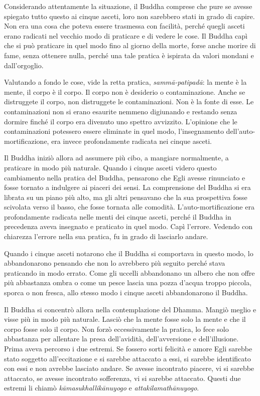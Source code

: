 Considerando attentamente la situazione, il Buddha comprese che pure se
avesse spiegato tutto questo ai cinque asceti, loro non sarebbero stati
in grado di capire. Non era una cosa che poteva essere trasmessa con
facilità, perché quegli asceti erano radicati nel vecchio modo di
praticare e di vedere le cose. Il Buddha capì che si può praticare in
quel modo fino al giorno della morte, forse anche morire di fame, senza
ottenere nulla, perché una tale pratica è ispirata da valori mondani e
dall'orgoglio.

Valutando a fondo le cose, vide la retta pratica, \emph{sammā-patipadā}:
la mente è la mente, il corpo è il corpo. Il corpo non è desiderio o
contaminazione. Anche se distruggete il corpo, non distruggete le
contaminazioni. Non è la fonte di esse. Le contaminazioni non si erano
esaurite nemmeno digiunando e restando senza dormire finché il corpo era
divenuto uno spettro avvizzito. L'opinione che le contaminazioni
potessero essere eliminate in quel modo, l'insegnamento
dell'auto-mortificazione, era invece profondamente radicata nei cinque
asceti.

Il Buddha iniziò allora ad assumere più cibo, a mangiare normalmente, a
praticare in modo più naturale. Quando i cinque asceti videro questo
cambiamento nella pratica del Buddha, pensarono che Egli avesse
rinunciato e fosse tornato a indulgere ai piaceri dei sensi. La
comprensione del Buddha si era librata su un piano più alto, ma gli
altri pensavano che la sua prospettiva fosse scivolata verso il basso,
che fosse tornata alle comodità. L'auto-mortificazione era profondamente
radicata nelle menti dei cinque asceti, perché il Buddha in precedenza
aveva insegnato e praticato in quel modo. Capì l'errore. Vedendo con
chiarezza l'errore nella sua pratica, fu in grado di lasciarlo andare.

Quando i cinque asceti notarono che il Buddha si comportava in questo
modo, lo abbandonarono pensando che non lo avrebbero più seguito perché
stava praticando in modo errato. Come gli uccelli abbandonano un albero
che non offre più abbastanza ombra o come un pesce lascia una pozza
d'acqua troppo piccola, sporca o non fresca, allo stesso modo i cinque
asceti abbandonarono il Buddha.

Il Buddha si concentrò allora nella contemplazione del Dhamma. Mangiò
meglio e visse più in modo più naturale. Lasciò che la mente fosse solo
la mente e che il corpo fosse solo il corpo. Non forzò eccessivamente la
pratica, lo fece solo abbastanza per allentare la presa dell'avidità,
dell'avversione e dell'illusione. Prima aveva percorso i due estremi. Se
fossero sorti felicità e amore Egli sarebbe stato soggetto
all'eccitazione e si sarebbe attaccato a essi, si sarebbe identificato
con essi e non avrebbe lasciato andare. Se avesse incontrato piacere, vi
si sarebbe attaccato, se avesse incontrato sofferenza, vi si sarebbe
attaccato. Questi due estremi li chiamò \emph{kāmasukhallikānuyogo} e
\emph{attakilamathānuyogo}.

